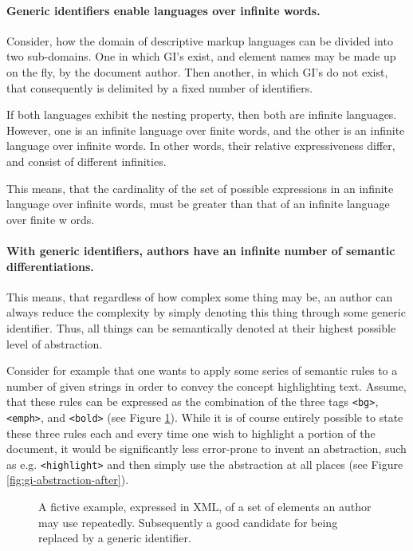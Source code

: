 \documentclass{scrreprt}
\begin{document}
\paragraph{Generic identifiers enable languages over infinite words.}
Consider, how the domain of descriptive markup languages can be divided into two sub-domains. One in which GI's exist, and element names may be made up on the fly, by the document author. Then another, in which GI's do not exist, that consequently is delimited by a fixed number of identifiers.

If both languages exhibit the nesting property, then both are infinite languages. However, one is an infinite language over finite words, and the other is an infinite language over infinite words. In other words, their relative expressiveness differ, and consist of different infinities.

This means, that the cardinality of the set of possible expressions in an infinite language over infinite words, must be greater than that of an infinite language over finite w ords.

\paragraph{With generic identifiers, authors have an infinite number of semantic differentiations. }
This means, that regardless of how complex some thing may be, an author can always reduce the complexity by simply denoting this thing through some generic identifier. Thus, all things can be semantically denoted at their highest possible level of abstraction.

Consider for example that one wants to apply some series of semantic rules to a number of given strings in order to convey the concept highlighting text. Assume, that these rules can be expressed as the combination of the three tags \texttt{<bg>}, \texttt{<emph>}, and \texttt{<bold>} (see Figure \ref{fig:gi-abstraction-before}). While it is of course entirely possible to state these three rules each and every time one wish to highlight a portion of the document, it would be significantly less error-prone to invent an abstraction, such as e.g. \texttt{<highlight>} and then simply use the abstraction at all places (see Figure \ref{fig:gi-abstraction-after}).

\begin{figure}[h]
\centering
{}
\caption{A fictive example, expressed in XML, of a set of elements an author may use repeatedly. Subsequently a good candidate for being replaced by a generic identifier.}
\label{fig:gi-abstraction-before}
\end{figure}
\end{document}
